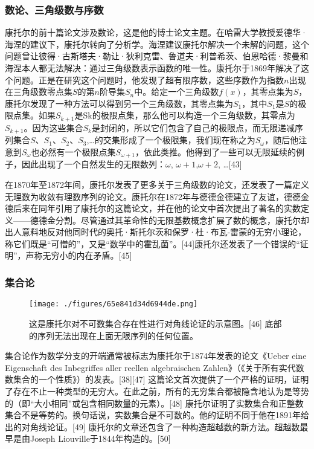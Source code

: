 \subsubsection{数论、三角级数与序数}  
康托尔的前十篇论文涉及数论，这是他的博士论文主题。在哈雷大学教授爱德华·海涅的建议下，康托尔转向了分析学。海涅建议康托尔解决一个未解的问题，这个问题曾让彼得·古斯塔夫·勒让·狄利克雷、鲁道夫·利普希茨、伯恩哈德·黎曼和海涅本人都无法解决：通过三角级数表示函数的唯一性。康托尔于1869年解决了这个问题。正是在研究这个问题时，他发现了超有限序数，这些序数作为指数\(n\)出现在三角级数零点集\(S\)的第\(n\)阶导集\(S_n\)中。给定一个三角级数\(f(x)\)，其零点集为\(S\)，康托尔发现了一种方法可以得到另一个三角级数，其零点集为\(S_1\)，其中\(S_1\)是\(S\)的极限点集。如果\(S_{k+1}\)是Sk的极限点集，那么他可以构造一个三角级数，其零点为\(S_{k+1}\)。因为这些集合\(S_k\)是封闭的，所以它们包含了自己的极限点，而无限递减序列集合\(S\)、\(S_1\)、\(S_2\)、\(S_3\),…的交集形成了一个极限集，我们现在称之为\(S_\omega\)，随后他注意到\(S_\omega\)也必然有一个极限点集\(S_{\omega+1}\)，依此类推。他得到了一些可以无限延续的例子，因此出现了一个自然发生的无限数列：\(\omega\), \(\omega+1\),\(\omega+2\), …[43]

在1870年至1872年间，康托尔发表了更多关于三角级数的论文，还发表了一篇定义无理数为收敛有理数序列的论文。康托尔在1872年与德德金德建立了友谊，德德金德后来在同年引用了康托尔的这篇论文，并在他的论文中首次提出了著名的实数定义——德德金分割。尽管通过其革命性的无限基数概念扩展了数的概念，康托尔却出人意料地反对他同时代的奥托·斯托尔茨和保罗·杜·布瓦-雷蒙的无穷小理论，称它们既是“可憎的”，又是“数学中的霍乱菌”。[44]康托尔还发表了一个错误的“证明”，声称无穷小的内在矛盾。[45]
\subsubsection{集合论}
\begin{figure}[ht]
\centering
\texttt{[image: ./figures/65e841d34d6944de.png]}
\caption{这是康托尔对不可数集合存在性进行对角线论证的示意图。[46] 底部的序列无法出现在上面无限序列的任何位置。} \label{fig_Canto_3}
\end{figure}
集合论作为数学分支的开端通常被标志为康托尔于1874年发表的论文《Ueber eine Eigenschaft des Inbegriffes aller reellen algebraischen Zahlen》（《关于所有实代数数集合的一个性质》）的发表。[38][47] 这篇论文首次提供了一个严格的证明，证明了存在不止一种类型的无穷大。在此之前，所有的无穷集合都被隐含地认为是等势的（即“大小相同”或包含相同数量的元素）。[48] 康托尔证明了实数集合和正整数集合不是等势的。换句话说，实数集合是不可数的。他的证明不同于他在1891年给出的对角线论证。[49] 康托尔的文章还包含了一种构造超越数的新方法。超越数最早是由Joseph Liouville于1844年构造的。[50]

